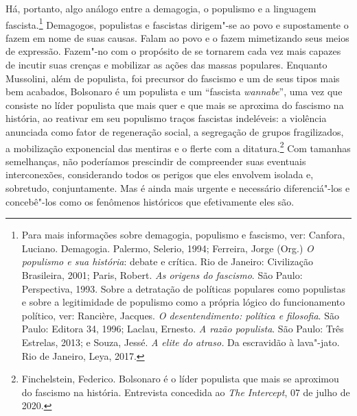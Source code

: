 Há, portanto, algo análogo entre a demagogia, o populismo e a linguagem
fascista.\footnote{Para mais informações sobre demagogia, populismo e
  fascismo, ver: Canfora, Luciano. Demagogia. Palermo, Selerio, 1994;
  Ferreira, Jorge (Org.) \emph{O populismo e sua história}: debate e
  crítica. Rio de Janeiro: Civilização Brasileira, 2001; Paris, Robert.
  \emph{As origens do fascismo}. São Paulo: Perspectiva, 1993. Sobre a
  detratação de políticas populares como populistas e sobre a
  legitimidade de populismo como a própria lógico do funcionamento
  político, ver: Rancière, Jacques. \emph{O desentendimento: política e
  filosofia}. São Paulo: Editora 34, 1996; Laclau, Ernesto. \emph{A
  razão populista}. São Paulo: Três Estrelas, 2013; e Souza, Jessé.
  \emph{A elite do atraso.} Da escravidão à lava"-jato. Rio de Janeiro,
  Leya, 2017.} Demagogos, populistas e fascistas dirigem"-se ao povo e
supostamente o fazem em nome de suas causas. Falam ao povo e o fazem
mimetizando seus meios de expressão. Fazem"-no com o propósito de se
tornarem cada vez mais capazes de incutir suas crenças e mobilizar as
ações das massas populares. Enquanto Mussolini, além de populista, foi
precursor do fascismo e um de seus tipos mais bem acabados, Bolsonaro é
um populista e um ``fascista \emph{wannabe}'', uma vez que consiste no
líder populista que mais quer e que mais se aproxima do fascismo na
história, ao reativar em seu populismo traços fascistas indeléveis: a
violência anunciada como fator de regeneração social, a segregação de
grupos fragilizados, a mobilização exponencial das mentiras e o flerte
com a ditatura.\footnote{Finchelstein, Federico. Bolsonaro é o líder
  populista que mais se aproximou do fascismo na história. Entrevista
  concedida ao \emph{The Intercept}, 07 de julho de 2020.}
Com tamanhas semelhanças, não poderíamos prescindir de compreender suas
eventuais interconexões, considerando todos os perigos que eles envolvem
isolada e, sobretudo, conjuntamente. Mas é ainda mais urgente e
necessário diferenciá"-los e concebê"-los como os fenômenos históricos que
efetivamente eles são.

